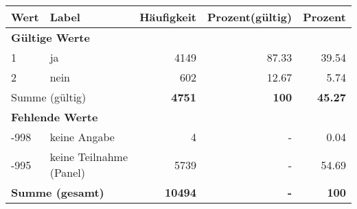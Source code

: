      \begin{longtable}{lXrrr}
     \toprule
     \textbf{Wert} & \textbf{Label} & \textbf{Häufigkeit} & \textbf{Prozent(gültig)} & \textbf{Prozent} \\
     \endhead
     \midrule
     \multicolumn{5}{l}{\textbf{Gültige Werte}}\\

     1 &
     \multicolumn{1}{X}{ ja   } &


       \num{4149} &
       \num[round-mode=places,round-precision=2]{87.33} &
         \num[round-mode=places,round-precision=2]{39.54} \\

     2 &
     \multicolumn{1}{X}{ nein   } &


       \num{602} &
       \num[round-mode=places,round-precision=2]{12.67} &
         \num[round-mode=places,round-precision=2]{5.74} \\
     \midrule
     \multicolumn{2}{l}{Summe (gültig)} &
       \textbf{\num{4751}} &
     \textbf{\num{100}} &
       \textbf{\num[round-mode=places,round-precision=2]{45.27}} \\
     \multicolumn{5}{l}{\textbf{Fehlende Werte}}\\
       -998 &
       keine Angabe &
         \num{4} &
        - &
         \num[round-mode=places,round-precision=2]{0.04} \\
       -995 &
       keine Teilnahme (Panel) &
         \num{5739} &
        - &
         \num[round-mode=places,round-precision=2]{54.69} \\
     \midrule
     \multicolumn{2}{l}{\textbf{Summe (gesamt)}} &
          \textbf{\num{10494}} &
        \textbf{-} &
        \textbf{\num{100}} \\
     \bottomrule
     \end{longtable}
     
